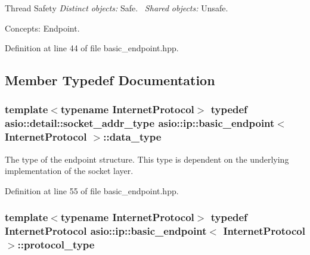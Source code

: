 \begin{DoxyParagraph}{Thread Safety}
{\itshape Distinct} {\itshape objects\+:} Safe.~\newline
{\itshape Shared} {\itshape objects\+:} Unsafe.
\end{DoxyParagraph}
\begin{DoxyParagraph}{Concepts\+:}
Endpoint. 
\end{DoxyParagraph}


Definition at line 44 of file basic\+\_\+endpoint.\+hpp.



\subsection{Member Typedef Documentation}
\hypertarget{classasio_1_1ip_1_1basic__endpoint_a080cc84bcb7c39ec426a3670b9456c44}{}
\subsubsection[{data\+\_\+type}]{\setlength{\rightskip}{0pt plus 5cm}template$<$typename Internet\+Protocol$>$ typedef {\bf asio\+::detail\+::socket\+\_\+addr\+\_\+type} {\bf asio\+::ip\+::basic\+\_\+endpoint}$<$ Internet\+Protocol $>$\+::{\bf data\+\_\+type}}\label{classasio_1_1ip_1_1basic__endpoint_a080cc84bcb7c39ec426a3670b9456c44}
The type of the endpoint structure. This type is dependent on the underlying implementation of the socket layer. 

Definition at line 55 of file basic\+\_\+endpoint.\+hpp.

\hypertarget{classasio_1_1ip_1_1basic__endpoint_a0a1e636ae6281b37349b7dbdb4791a09}{}
\subsubsection[{protocol\+\_\+type}]{\setlength{\rightskip}{0pt plus 5cm}template$<$typename Internet\+Protocol$>$ typedef Internet\+Protocol {\bf asio\+::ip\+::basic\+\_\+endpoint}$<$ Internet\+Protocol $>$\+::{\bf protocol\+\_\+type}}\label{classasio_1_1ip_1_1basic__endpoint_a0a1e636ae6281b37349b7dbdb4791a09}


